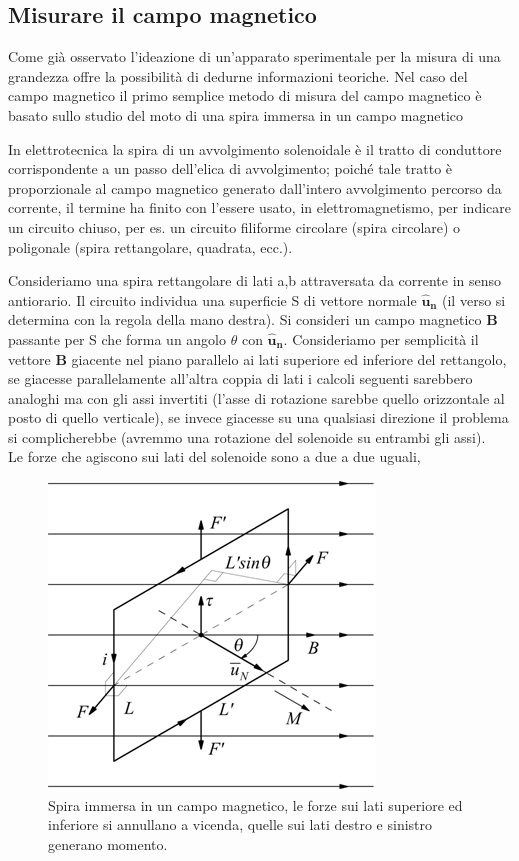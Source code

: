 \documentclass[
10pt, %
a4paper, %
oneside, %
headinclude,footinclude, %
BCOR5mm, %
]{scrartcl}
\begin{document}
\subsection{Misurare il campo magnetico}
Come già osservato l'ideazione di un'apparato sperimentale per la misura di una grandezza offre la possibilità di dedurne informazioni teoriche. Nel caso del campo magnetico il primo semplice metodo di misura del campo magnetico è basato sullo studio del moto di una spira immersa in un campo magnetico
\begin{definizione}[Spira]
	 In elettrotecnica la spira di un avvolgimento solenoidale è il tratto di conduttore corrispondente a un passo dell’elica di avvolgimento; poiché tale tratto è proporzionale al campo magnetico generato dall'intero avvolgimento percorso da corrente, il termine ha finito con l’essere usato, in elettromagnetismo, per indicare un circuito chiuso, per es. un circuito filiforme circolare (spira circolare) o poligonale (spira rettangolare, quadrata, ecc.).
\end{definizione}
Consideriamo una spira rettangolare di lati a,b attraversata da corrente in senso antiorario. Il circuito individua una superficie S di vettore normale $\mathbf{\hat{u}_n}$ (il verso si determina con la regola della mano destra). Si consideri un campo magnetico $\mathbf{B}$ passante per S che forma un angolo $\theta$ con $\mathbf{\hat{u}_n}$. Consideriamo per semplicità il vettore $\mathbf{B}$ giacente nel piano parallelo ai lati superiore ed inferiore del rettangolo, se giacesse parallelamente all'altra coppia di lati i calcoli seguenti sarebbero analoghi ma con gli assi invertiti (l'asse di rotazione sarebbe quello orizzontale al posto di quello verticale), se invece giacesse su una qualsiasi direzione il problema si complicherebbe (avremmo una rotazione del solenoide su entrambi gli assi).\\
Le forze che agiscono sui lati del solenoide sono a due a due uguali,
\begin{figure}[h!]
	\centering
	\includegraphics[width=0.5\linewidth]{images/spira_campo_magnetico}
	\caption{Spira immersa in un campo magnetico, le forze sui lati superiore ed inferiore si annullano a vicenda, quelle sui lati destro e sinistro generano momento.}
	\label{fig:spiracampomagnetico}
\end{figure}
\end{document}
